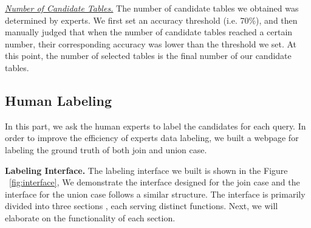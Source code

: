 

\noindent  \underline{\textit{Number of Candidate Tables.}}  The number of candidate tables we obtained was determined by experts. We first set an accuracy threshold (i.e. 70\%), and then manually judged that when the number of candidate tables reached a certain number, their corresponding accuracy was lower than the threshold we set. At this point, the number of selected tables is the final number of our candidate tables.


\subsection{Human Labeling}
In this part, we ask the human experts to label the candidates for each query. In order to improve the efficiency of experts data labeling, we built a webpage for labeling the ground truth of both join and union case.


\noindent \textbf{Labeling Interface.} 
The labeling interface we built is shown in the Figure ~\ref{fig:interface}, We demonstrate the interface designed for the join case and the interface for the union case follows a similar structure. The interface is primarily divided into three sections , each serving distinct functions. Next, we will elaborate on the functionality of each section.

